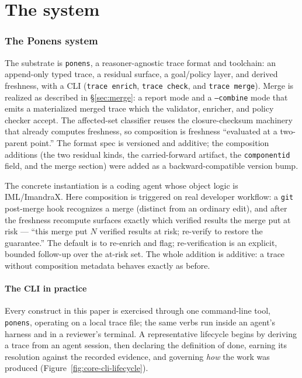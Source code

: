 \documentclass[11pt]{article}
\newcommand{\codeus}{\textunderscore\penalty100\relax}
\newcommand{\code}[1]{\texttt{\let\_\codeus #1}}
\begin{document}
\part{The system}

\section{The Ponens system}\label{sec:impl}

The substrate is \code{ponens}, a reasoner-agnostic trace format and toolchain: an append-only typed trace,
a residual surface, a goal/policy layer, and derived freshness, with a CLI (\code{trace enrich},
\code{trace check}, and \code{trace merge}). Merge is realized as described in \S\ref{sec:merge}: a report
mode and a \code{--combine} mode that emits a materialized merged trace which the validator, enricher, and
policy checker accept. The affected-set classifier reuses the closure-checksum machinery that already
computes freshness, so composition is freshness ``evaluated at a two-parent point.'' The format spec is
versioned and additive; the composition additions (the two residual kinds, the carried-forward artifact, the
\code{component\_id} field, and the merge section) were added as a backward-compatible version bump.

The concrete instantiation is a coding agent whose object logic is IML/ImandraX. Here composition is
triggered on real developer workflow: a \code{git} post-merge hook recognizes a merge (distinct from an
ordinary edit), and after the freshness recompute surfaces exactly which verified results the merge put at
risk --- ``this merge put $N$ verified results at risk; re-verify to restore the guarantee.'' The default is
to re-enrich and flag; re-verification is an explicit, bounded follow-up over the at-risk set. The whole
addition is additive: a trace without composition metadata behaves exactly as before.

\subsection{The CLI in practice}\label{sec:impl-cli}

Every construct in this paper is exercised through one command-line tool, \code{ponens}, operating on a local
trace file; the same verbs run inside an agent's harness and in a reviewer's terminal. A representative
lifecycle begins by deriving a trace from an agent session, then declaring the definition of done, earning
its resolution against the recorded evidence, and governing \emph{how} the work was produced
(Figure~\ref{fig:core-cli-lifecycle}).
\end{document}
